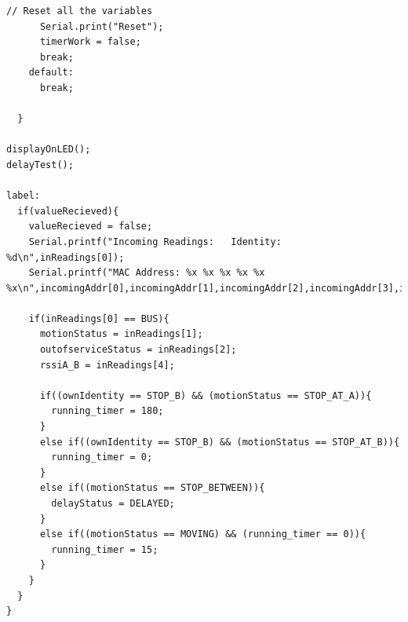 \documentclass[12pt]{article} %
\begin{document}
\begin{lstlisting}[style=myArduino]
      // Reset all the variables
      Serial.print("Reset");
      timerWork = false;
      break;
    default:
      break;
  
  }
  
displayOnLED();
delayTest();

label:
  if(valueRecieved){
    valueRecieved = false;
    Serial.printf("Incoming Readings:   Identity: %d\n",inReadings[0]);
    Serial.printf("MAC Address: %x %x %x %x %x %x\n",incomingAddr[0],incomingAddr[1],incomingAddr[2],incomingAddr[3],incomingAddr[4],incomingAddr[5]);

    if(inReadings[0] == BUS){
      motionStatus = inReadings[1];
      outofserviceStatus = inReadings[2];
      rssiA_B = inReadings[4];
    
      if((ownIdentity == STOP_B) && (motionStatus == STOP_AT_A)){
        running_timer = 180;
      }
      else if((ownIdentity == STOP_B) && (motionStatus == STOP_AT_B)){
        running_timer = 0;
      }
      else if((motionStatus == STOP_BETWEEN)){
        delayStatus = DELAYED;
      }
      else if((motionStatus == MOVING) && (running_timer == 0)){
        running_timer = 15;
      }
    }
  }
}
\end{lstlisting}


\nocite{celan_bus-stop_2017}
\nocite{watelectronics_ultrasonic_2022}
\nocite{rashvand_real-time_2024}
\nocite{noauthor_5_2020}
\nocite{noauthor_fixed_nodate}
\nocite{utmel_proximity_nodate}
\clearpage
\begingroup
\let\oldthesection\thesection
\addtocounter{section}{+1}
\let\thesection\oldthesection 
\endgroup


\clearpage
\section*{}
\printglossary[type=\acronymtype]

\clearpage

\section*{}
\printglossary

\clearpage

\printindex
\clearpage
\end{document}
